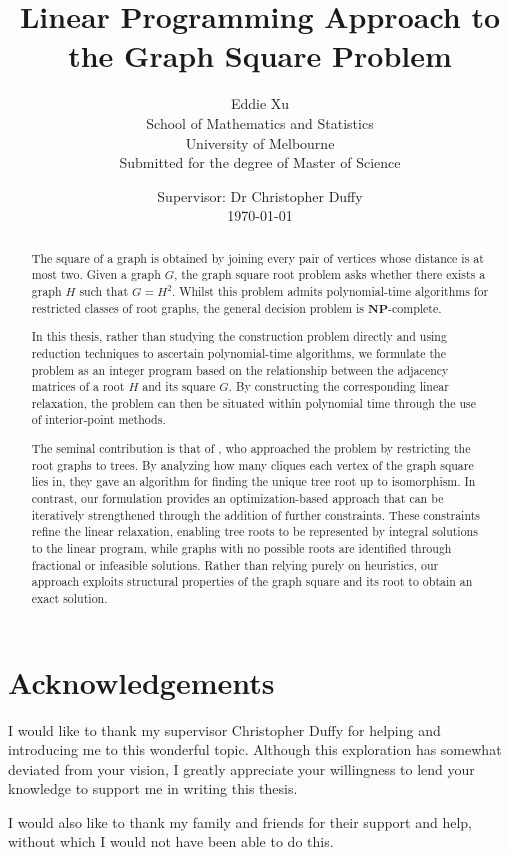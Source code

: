 \documentclass[11pt]{report}
\title{\fontsize{30}{36}\selectfont Linear Programming Approach to the Graph Square Problem}
\author{
    Eddie Xu \\[2em]
    School of Mathematics and Statistics \\
    University of Melbourne \\[2em]
    Submitted for the degree of Master of Science
}
\date{
    \vspace{2em}
    Supervisor: Dr Christopher Duffy \\[1em]
    \today
}
\begin{document}
\maketitle

\begin{abstract}
  The square of a graph is obtained by joining every pair of vertices whose distance is at most two. Given a graph $G$, the graph square root problem asks whether there exists a graph $H$ such that $G=H^2$. Whilst this problem admits polynomial-time algorithms for restricted classes of root graphs, the general decision problem is $\mathbf{NP}$-complete.

  In this thesis, rather than studying the construction problem directly and using reduction techniques to ascertain polynomial-time algorithms, we formulate the problem as an integer program based on the relationship between the adjacency matrices of a root $H$ and its square $G$. By constructing the corresponding linear relaxation, the problem can then be situated within polynomial time through the use of interior-point methods.

  The seminal contribution is that of \citeauthor{ross_1960_square}, who approached the problem by restricting the root graphs to trees. By analyzing how many cliques each vertex of the graph square lies in, they gave an algorithm for finding the unique tree root up to isomorphism. In contrast, our formulation provides an optimization-based approach that can be iteratively strengthened through the addition of further constraints. These constraints refine the linear relaxation, enabling tree roots to be represented by integral solutions to the linear program, while graphs with no possible roots are identified through fractional or infeasible solutions. Rather than relying purely on heuristics, our approach exploits structural properties of the graph square and its root to obtain an exact solution. 
\end{abstract}

\chapter*{Acknowledgements}

I would like to thank my supervisor Christopher Duffy for helping and introducing me to this wonderful topic. Although this exploration has somewhat deviated from your vision, I greatly appreciate your willingness to lend your knowledge to support me in writing this thesis.

I would also like to thank my family and friends for their support and help, without which I would not have been able to do this.
\end{document}
